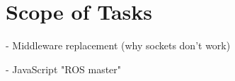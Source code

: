 \chapter{Scope of Tasks}\label{cha:scope}

- Middleware replacement (why sockets don't work)

- JavaScript "ROS master"